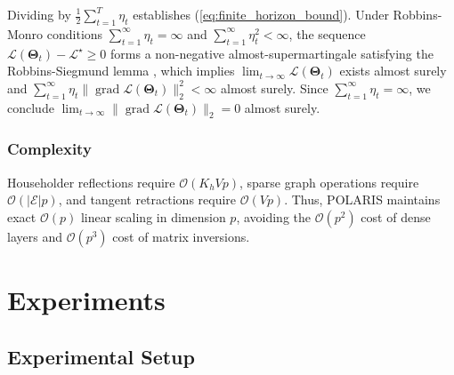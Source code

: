 \documentclass[journal]{IEEEtran}
\begin{document}
\begin{IEEEproof}
Dividing by $\frac{1}{2}\sum_{t=1}^T \eta_t$ establishes (\ref{eq:finite_horizon_bound}). Under Robbins-Monro conditions $\sum_{t=1}^\infty \eta_t = \infty$ and $\sum_{t=1}^\infty \eta_t^2 < \infty$, the sequence $\mathcal{L}(\boldsymbol{\Theta}_t) - \mathcal{L}^\star \ge 0$ forms a non-negative almost-supermartingale satisfying the Robbins-Siegmund lemma \cite{robbins1971convergence}, which implies $\lim_{t\to\infty}\mathcal{L}(\boldsymbol{\Theta}_t)$ exists almost surely and $\sum_{t=1}^\infty \eta_t \|\operatorname{grad}\mathcal{L}(\boldsymbol{\Theta}_t)\|_2^2 < \infty$ almost surely. Since $\sum_{t=1}^\infty \eta_t = \infty$, we conclude $\lim_{t\to\infty}\|\operatorname{grad}\mathcal{L}(\boldsymbol{\Theta}_t)\|_2 = 0$ almost surely.
\end{IEEEproof}

\subsubsection{Complexity}
Householder reflections require $\mathcal{O}(K_h V p)$, sparse graph operations require $\mathcal{O}(|\mathcal{E}|p)$, and tangent retractions require $\mathcal{O}(Vp)$. Thus, POLARIS maintains exact $\mathcal{O}(p)$ linear scaling in dimension $p$, avoiding the $\mathcal{O}(p^2)$ cost of dense layers and $\mathcal{O}(p^3)$ cost of matrix inversions.

\section{Experiments}

\subsection{Experimental Setup}
\end{document}
